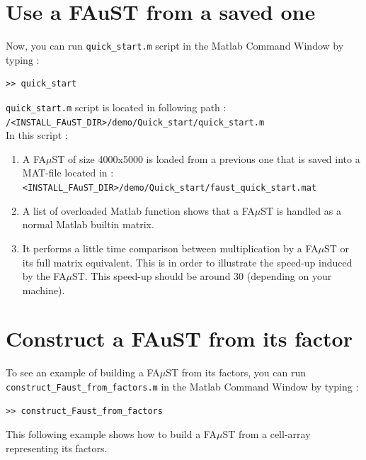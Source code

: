 \section{Use a FAuST from a saved one}\label{sec:firstUseBuildFromSave}
Now, you can run \texttt{quick\_start.m} script in the Matlab Command Window by typing :
\lstset{style=customMatlab}
\begin{lstlisting}
>> quick_start
\end{lstlisting}
\texttt{quick\_start.m} script is located in following path :\\
\texttt{/<INSTALL\_FAuST\_DIR>/demo/Quick\_start/quick\_start.m} \\
In this script :
\begin{enumerate} 
	\item A FA$\mu$ST of size 4000x5000 is loaded from a previous one that is saved into a MAT-file located in :\\
	\texttt{<INSTALL\_FAuST\_DIR>/demo/Quick\_start/faust\_quick\_start.mat}
	
	
	\item  A list of overloaded Matlab function shows that a FA$\mu$ST is handled as a normal Matlab builtin matrix.
 	

	\item It performs a little time comparison between multiplication by a FA$\mu$ST or its full matrix equivalent.
This is in order to illustrate the speed-up induced by the FA$\mu$ST. This speed-up should be around 30 (depending on your machine).
	
\end{enumerate}


\section{Construct a FAuST from its factor}\label{sec:firstUseBuildFactors}
To see an example of building a FA$\mu$ST from its factors, you can run \texttt{construct\_Faust\_from\_factors.m} in the Matlab Command Window by typing :
\lstset{style=customMatlab}
\begin{lstlisting}
>> construct_Faust_from_factors
\end{lstlisting}
This following example shows how to build a FA$\mu$ST from a cell-array representing its factors.


